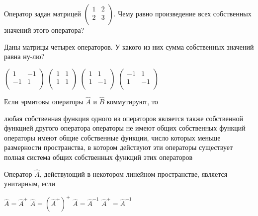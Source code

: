 \documentclass[11pt,a4paper]{exam}
\begin{document}
\begin{questions}
\question Оператор задан матрицей $\left( \begin{matrix}
   1 & 2  \\
   2 & 3  \\
\end{matrix} \right)$. Чему равно произведение всех собственных значений этого оператора?
\begin{choices}
\end{choices}

\question Даны матрицы четырех операторов. У какого из них сумма собственных значений равна ну-лю?
\begin{choices}
\choice $\left( \begin{matrix}
   1 & -1  \\
   -1 & 1  \\
\end{matrix} \right)$      
\choice $\left( \begin{matrix}
   1 & 1  \\
   1 & 1  \\
\end{matrix} \right)$      
\choice $\left( \begin{matrix}
   1 & 1  \\
   1 & -1  \\
\end{matrix} \right)$      
\choice $\left( \begin{matrix}
   -1 & 1  \\
   1 & -1  \\
\end{matrix} \right)$
\end{choices}

\question Если эрмитовы операторы $\hat{A}$ и $\hat{B}$ коммутируют, то 
\begin{choices}
\choice любая собственная функция одного из операторов является также собственной функцией другого оператора
\choice операторы не имеют общих собственных функций
\choice операторы имеют общие собственные функции, число которых меньше размерности пространства, в котором действуют эти операторы
\choice существует полная система общих собственных функций этих операторов
\end{choices}

\question Оператор $\hat{A}$, действующий в некотором линейном пространстве, является унитарным, если
\begin{choices}
\choice $\hat{A}={{\hat{A}}^{+}}$      
\choice $\hat{A}={{\left( {{{\hat{A}}}^{+}} \right)}^{+}}$     
\choice $\hat{A}={{\hat{A}}^{-1}}$     
\choice ${{\hat{A}}^{+}}={{\hat{A}}^{-1}}$
\end{choices}


\end{questions}
\end{document}
